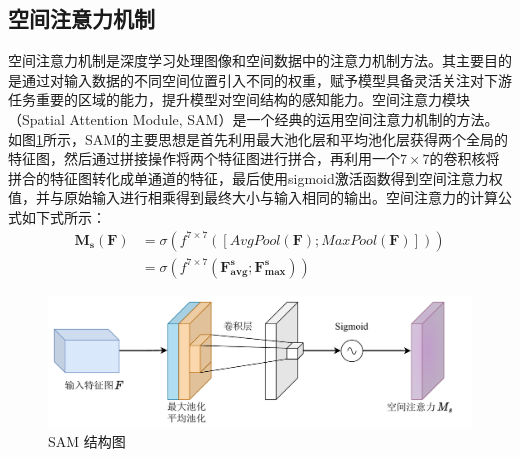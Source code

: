 \subsection{空间注意力机制}
空间注意力机制是深度学习处理图像和空间数据中的注意力机制方法。其主要目的是通过对输入数据的不同空间位置引入不同的权重，赋予模型具备灵活关注对下游任务重要的区域的能力，提升模型对空间结构的感知能力。空间注意力模块（Spatial Attention Module, SAM）是一个经典的运用空间注意力机制的方法。如图\ref{SAM}所示，SAM的主要思想是首先利用最大池化层和平均池化层获得两个全局的特征图，然后通过拼接操作将两个特征图进行拼合，再利用一个$7\times 7$的卷积核将拼合的特征图转化成单通道的特征，最后使用sigmoid激活函数得到空间注意力权值，并与原始输入进行相乘得到最终大小与输入相同的输出。空间注意力的计算公式如下式所示：
\begin{equation}
    \begin{aligned}
        \mathbf{M}_{\mathbf{s}}\left( \mathbf{F} \right) & =\sigma \left( f^{7\times 7}\left( \left[ AvgPool\left( \mathbf{F} \right) ;MaxPool\left( \mathbf{F} \right) \right] \right) \right)
        \\
                                                         & =\sigma \left( f^{7\times 7}\left( \mathbf{F}_{\mathbf{avg}}^{\mathbf{s}};\mathbf{F}_{\mathbf{max}}^{\mathbf{s}} \right) \right)
    \end{aligned}
\end{equation}

\begin{figure}[h]
    \centering
    \includegraphics[width=14cm]{pic/chapter3/空间注意力.pdf}
    \caption{SAM 结构图}
    \label{SAM}
\end{figure}
